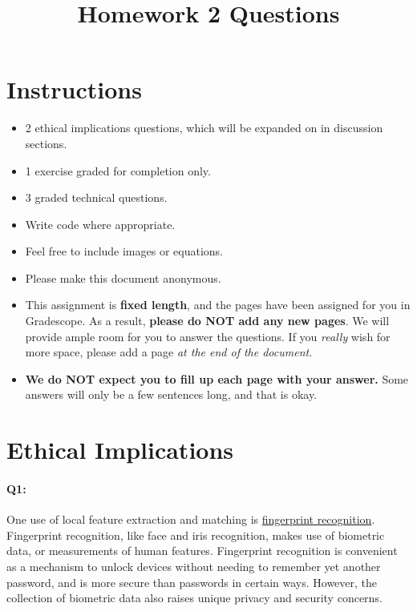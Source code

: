 \date{}

\title{\vspace{-1cm}Homework 2 Questions}



\maketitle
\vspace{-3cm}
\thispagestyle{fancy}

\section*{Instructions}
\begin{itemize}
  \item 2 ethical implications questions, which will be expanded on in discussion sections.
  \item 1 exercise graded for completion only.
  \item 3 graded technical questions.
  \item Write code where appropriate.
  \item Feel free to include images or equations.
  \item Please make this document anonymous.
  \item This assignment is \textbf{fixed length}, and the pages have been assigned for you in Gradescope. As a result, \textbf{please do NOT add any new pages}. We will provide ample room for you to answer the questions. If you \emph{really} wish for more space, please add a page \emph{at the end of the document}.
  \item \textbf{We do NOT expect you to fill up each page with your answer.} Some answers will only be a few sentences long, and that is okay.
\end{itemize}
\pagebreak
\section*{Ethical Implications}

\paragraph{Q1:} One use of local feature extraction and matching is \href{https://www.youtube.com/watch?v=xD88Qs_DZp4}{fingerprint recognition}. Fingerprint recognition, like face and iris recognition, makes use of biometric data, or measurements of human features. Fingerprint recognition is convenient as a mechanism to unlock devices without needing to remember yet another password, and is more secure than passwords in certain ways. However, the collection of biometric data also raises unique privacy and security concerns.

